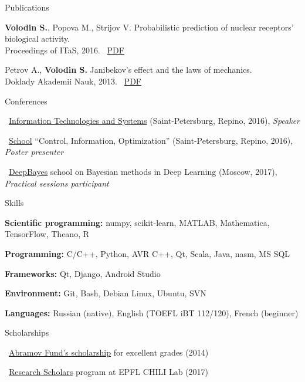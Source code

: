 \documentclass{resume} %
\begin{document}
\begin{rSection}{Publications}
\item {\bf Volodin S.}, Popova M., Strijov V. Probabilistic prediction of nuclear receptors’ biological activity.\\ Proceedings of ITaS, 2016. \faExternalLink~\href{http://itas2016.iitp.ru/pdf/1570303389.pdf}{PDF}
\item Petrov A., {\bf Volodin S.} Janibekov’s effect and the laws of mechanics.\\ Doklady Akademii Nauk, 2013. \faExternalLink~\href{https://link.springer.com/article/10.1134/S1028335813080041}{PDF}
\end{rSection}

\begin{rSection}{Conferences}
\item \faExternalLink~\href{http://iitp.ru/en/conferences/itas}{Information Technologies and Systems} (Saint-Petersburg, Repino, 2016){, \em Speaker}
\item \faExternalLink~\href{https://sites.google.com/site/traditionalschool/about}{School} ``Control, Information, Optimization'' (Saint-Petersburg, Repino, 2016){, \em Poster presenter}
\item \faExternalLink~\href{http://deepbayes.ru}{DeepBayes} school on Bayesian methods in Deep Learning (Moscow, 2017){, \em Practical sessions participant}
\end{rSection}

\begin{rSection}{Skills}
	\item {\bf Scientific programming:} numpy, scikit-learn, MATLAB, Mathematica, TensorFlow, Theano, R
	\item {\bf Programming:} C/C++, Python, AVR C++, Qt, Scala, Java, nasm, MS SQL
	\item {\bf Frameworks:} Qt, Django, Android Studio
	\item {\bf Environment:} Git, Bash, Debian Linux, Ubuntu, SVN
	\item {\bf Languages:} Russian (native), English (TOEFL iBT 112/120), French (beginner)
\end{rSection}

\begin{rSection}{Scholarships}
\item \faExternalLink~\href{http://phystech-foundation.org/}{Abramov Fund's scholarship} for excellent grades (2014)
\item \faExternalLink~\href{https://ic.epfl.ch/ResearchScholars}{Research Scholars} program at EPFL CHILI Lab (2017)
\end{rSection}
\end{document}
